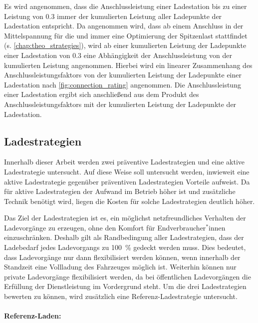 Es wird angenommen, dass die Anschlussleistung einer Ladestation bis zu einer Leistung von \SI{0.3}{\mva} immer der kumulierten Leistung aller Ladepunkte der Ladestation entspricht.
Da angenommen wird, dass ab einem Anschluss in der Mittelspannung für die \UCs \zH und \Firmeparkplatz immer eine Optimierung der Spitzenlast stattfindet (s. \autoref{chap:theo_strategies}), wird ab einer kumulierten Leistung der Ladepunkte einer Ladestation von \SI{0.3}{\mva} eine Abhängigkeit der Anschlussleistung von der kumulierten Leistung angenommen.
Hierbei wird ein linearer Zusammenhang des Anschlussleistungsfaktors von der kumulierten Leistung der Ladepunkte einer Ladestation nach \autoref{fig:connection_rating} angenommen.
Die Anschlussleistung einer Ladestation ergibt sich anschließend aus dem Produkt des Anschlussleistungsfaktors mit der kumulierten Leistung der Ladepunkte der Ladestation.




\subsection{Ladestrategien}\label{chap:theo_strategies}

Innerhalb dieser Arbeit werden zwei präventive Ladestrategien und eine aktive Ladestrategie untersucht.
Auf diese Weise soll untersucht werden, inwieweit eine aktive Ladestrategie gegenüber präventiven Ladestrategien Vorteile aufweist.
Da für aktive Ladestrategien der Aufwand im Betrieb höher ist und zusätzliche Technik benötigt wird, liegen die Kosten für solche Ladestrategien deutlich höher.\medskip

Das Ziel der Ladestrategien ist es, ein möglichst netzfreundliches Verhalten der Ladevorgänge zu erzeugen, ohne den Komfort für Endverbraucher$^*$innen einzuschränken.
Deshalb gilt als Randbedingung aller Ladestrategien, dass der Ladebedarf jedes Ladevorgangs zu \SI{100}{\percent} gedeckt werden muss.
Dies bedeutet, dass Ladevorgänge nur dann flexibilisiert werden können, wenn innerhalb der Standzeit eine Vollladung des Fahrzeuges möglich ist.
Weiterhin können nur private Ladevorgänge flexibilisiert werden, da bei öffentlichen Ladevorgängen die Erfüllung der Dienstleistung im Vordergrund steht.
Um die drei Ladestrategien bewerten zu können, wird zusätzlich eine Referenz-Ladestrategie untersucht.


\paragraph{Referenz-Laden:}

